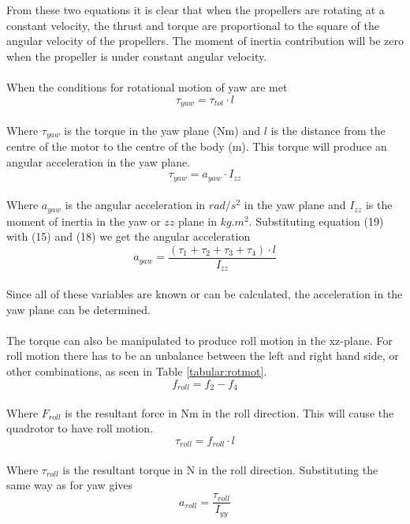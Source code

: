 From these two equations it is clear that when the propellers are rotating at a constant velocity, the thrust and torque are proportional to the square of the angular velocity of the propellers. The moment of inertia contribution will be zero when the propeller is under constant angular velocity. 
\\\\
When the conditions for rotational motion of yaw are met
\begin{equation}
\tau_{yaw} = \tau_{tot}\cdot l
\end{equation}
\\
Where $\tau_{yaw}$ is the torque in the yaw plane (Nm) and $l$ is the distance from the centre of the motor to the centre of the body (m). This torque will produce an angular acceleration in the yaw plane. 
\begin{equation}
\tau_{yaw} = a_{yaw}\cdot I_{zz}
\end{equation}
\\
Where $a_{yaw}$ is the angular acceleration in $rad/s^2$ in the yaw plane and $I_{zz}$ is the moment of inertia in the yaw or $zz$ plane in $kg.m^2$. Substituting equation (19) with (15) and (18) we get the angular acceleration
\begin{equation}
a_{yaw} = \frac{(\tau_1 + \tau_2 + \tau_3 + \tau_4) \cdot l}{I_{zz}}
\end{equation}
\\ 
Since all of these variables are known or can be calculated, the acceleration in the yaw plane can be determined. 
\\\\
The torque can also be manipulated to produce roll motion in the xz-plane. For roll motion there has to be an unbalance between the left and right hand side, or other combinations, as seen in Table \ref{tabular:rotmot}. 
\begin{equation}
f_{roll} = f_2 - f_4
\end{equation}
\\
Where $F_{roll}$ is the resultant force in Nm in the roll direction. This will cause the quadrotor to have roll motion. 
\begin{equation}
\tau_{roll} = f_{roll}\cdot l
\end{equation}
\\
Where $\tau_{roll}$ is the resultant torque in N in the roll direction. Substituting the same way as for yaw gives
\begin{equation}
a_{roll} = \frac{\tau_{roll}}{I_{yy}}
\end{equation}
